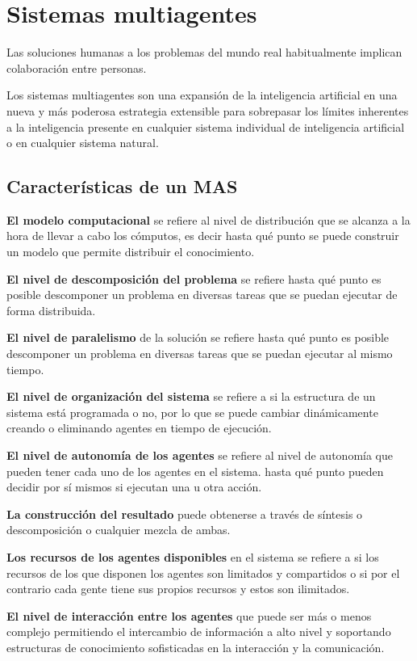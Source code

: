 \documentclass[12pt, twoside, openright]{report} %
\begin{document}
\section{Sistemas multiagentes}
Las soluciones humanas a los problemas del mundo real habitualmente implican colaboración entre personas. 

Los sistemas multiagentes son una expansión de la inteligencia artificial en una nueva y más poderosa estrategia extensible para sobrepasar los límites inherentes a la inteligencia presente en cualquier sistema individual de inteligencia artificial o en cualquier sistema natural. 

\subsection{Características de un MAS}
\textbf{El modelo computacional} se refiere al nivel de distribución que se alcanza a la hora de llevar a cabo los cómputos, es decir hasta qué punto se puede construir un modelo que permite distribuir el conocimiento. 

\textbf{El nivel de descomposición del problema} se refiere hasta qué punto es posible descomponer un problema en diversas tareas que se puedan ejecutar de forma distribuida.

\textbf{El nivel de paralelismo} de la solución se refiere hasta qué punto es posible descomponer un problema en diversas tareas que se puedan ejecutar al mismo tiempo.

\textbf{El nivel de organización del sistema} se refiere a si la estructura de un sistema está programada o no, por lo que se puede cambiar dinámicamente creando o eliminando agentes en tiempo de ejecución. 

\textbf{El nivel de autonomía de los agentes} se refiere al nivel de autonomía que pueden tener cada uno de los agentes en el sistema. hasta qué punto pueden decidir por sí mismos si ejecutan una u otra acción. 

\textbf{La construcción del resultado} puede obtenerse a través de síntesis o descomposición o cualquier mezcla de ambas.
\pagebreak

\textbf{Los recursos de los agentes disponibles} en el sistema se refiere a si los recursos de los que disponen los agentes son limitados y compartidos o si por el contrario cada gente tiene sus propios recursos y estos son ilimitados. 

\textbf{El nivel de interacción entre los agentes} que puede ser más o menos complejo permitiendo el intercambio de información a alto nivel y soportando estructuras de conocimiento sofisticadas en la interacción y la comunicación.
\end{document}
